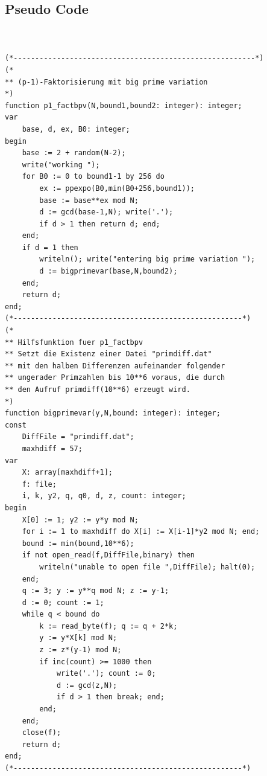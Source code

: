 \documentclass[10pt, bigheadings]{scrartcl}
\begin{document}
\subsection{Pseudo Code}
\begin{verbatim}


(*--------------------------------------------------------*)
(*
** (p-1)-Faktorisierung mit big prime variation
*)
function p1_factbpv(N,bound1,bound2: integer): integer;
var
    base, d, ex, B0: integer;
begin
    base := 2 + random(N-2);
    write("working ");
    for B0 := 0 to bound1-1 by 256 do
        ex := ppexpo(B0,min(B0+256,bound1));
        base := base**ex mod N;
        d := gcd(base-1,N); write('.');
        if d > 1 then return d; end;
    end;
    if d = 1 then
        writeln(); write("entering big prime variation ");
        d := bigprimevar(base,N,bound2);
    end;
    return d;
end;
(*-----------------------------------------------------*)
(*
** Hilfsfunktion fuer p1_factbpv
** Setzt die Existenz einer Datei "primdiff.dat"
** mit den halben Differenzen aufeinander folgender
** ungerader Primzahlen bis 10**6 voraus, die durch
** den Aufruf primdiff(10**6) erzeugt wird.
*)
function bigprimevar(y,N,bound: integer): integer;
const
    DiffFile = "primdiff.dat";
    maxhdiff = 57;
var
    X: array[maxhdiff+1];
    f: file;
    i, k, y2, q, q0, d, z, count: integer;
begin
    X[0] := 1; y2 := y*y mod N;
    for i := 1 to maxhdiff do X[i] := X[i-1]*y2 mod N; end;
    bound := min(bound,10**6);
    if not open_read(f,DiffFile,binary) then
        writeln("unable to open file ",DiffFile); halt(0);
    end;
    q := 3; y := y**q mod N; z := y-1;
    d := 0; count := 1;
    while q < bound do
        k := read_byte(f); q := q + 2*k;
        y := y*X[k] mod N;
        z := z*(y-1) mod N;
        if inc(count) >= 1000 then
            write('.'); count := 0;
            d := gcd(z,N);
            if d > 1 then break; end;
        end;
    end;
    close(f);
    return d;
end;
(*-----------------------------------------------------*)



\end{verbatim}
\end{document}
